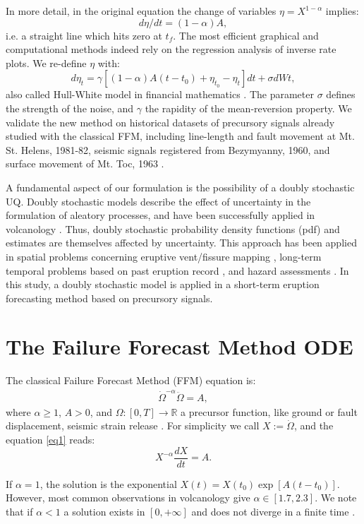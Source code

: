 \documentclass{article}
\begin{document}
In more detail, in the original equation the change of variables $\eta=X^{1-\alpha}$ implies:
$$d\eta/dt=(1-\alpha)A,$$
i.e. a straight line which hits zero at $t_f$. The most efficient graphical and computational methods indeed rely on the regression analysis of inverse rate plots. We re-define $\eta$ with:
$$d\eta_t=\gamma[(1-\alpha)A(t-t_0)+\eta_{t_0}-\eta_t]dt+\sigma dWt,$$
also called Hull-White model in financial mathematics \citep{HullWhite1990}. The parameter $\sigma$ defines the strength of the noise, and $\gamma$ the rapidity of the mean-reversion property. We validate the new method on historical datasets of precursory signals already studied with the classical FFM, including line-length and fault movement at Mt. St. Helens, 1981-82, seismic signals registered from Bezymyanny, 1960, and surface movement of Mt. Toc, 1963 \citep{Voight1988}.

A fundamental aspect of our formulation is the possibility of a doubly stochastic UQ. Doubly stochastic models describe the effect of uncertainty in the formulation of aleatory processes, and have been successfully applied in volcanology \citep{Sparks2004, Marzocchi2012, Bevilacqua2016}. Thus, doubly stochastic probability density functions (pdf) and estimates are themselves affected by uncertainty. This approach has been applied in spatial problems concerning eruptive vent/fissure mapping \citep{Selva2012, Bevilacqua2015, Tadini2017a, Tadini2017b, Bevilacqua2017a}, long-term temporal problems based on past eruption record \citep{Bebbington2013, Bevilacqua2016b, Richardson2017, Bevilacqua2018}, and hazard assessments \citep{Neri2015, Bevilacqua2017b}. In this study, a doubly stochastic model is applied in a short-term eruption forecasting method based on precursory signals.

\section{The Failure Forecast Method ODE}
The classical Failure Forecast Method (FFM) equation is:
\begin{align}\label{eq1}
\dot\Omega^{-\alpha}\ddot{\Omega}=A,
\end{align}
where $\alpha\ge 1$, $A>0$, and $\Omega:[0,T]\rightarrow \mathbb R$ a precursor function, like ground or fault displacement, seismic strain release \citep{Voight1988}. For simplicity we call $X:=\dot\Omega$, and the equation \ref{eq1} reads:
$$X^{-\alpha}\frac{dX}{dt}=A.$$

If $\alpha=1$, the solution is the exponential $X(t)=X(t_0)\exp[A(t-t_0)]$. However, most common observations in volcanology give $\alpha\in[1.7,2.3]$. We note that if $\alpha<1$ a solution exists in $[0,+\infty]$ and does not diverge in a finite time \citep{Cornelius1995}.
\end{document}
